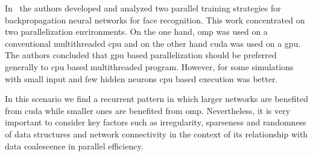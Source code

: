 {In~\cite{HUQQANI2013349} the authors developed and analyzed two parallel training strategies for backpropagation neural networks for face recognition. This work concentrated on two parallelization environments. On the one hand, \gls{omp} was used on a conventional multithreaded \gls{cpu} and on the other hand \gls{cuda} was used on a \gls{gpu}. The authors concluded that \gls{gpu} based parallelization should be preferred generally to \gls{cpu} based multithreaded program. However, for some simulations with small input and few hidden neurons \gls{cpu} based execution was better.

In this scenario we find a recurrent pattern in which larger networks are benefited from \gls{cuda} while smaller ones are benefited from \gls{omp}. Nevertheless, it is very important to consider key factors such as irregularity, sparseness and randomness of data structures and network connectivity in the context of its relationship with data coalescence in parallel efficiency.
}









